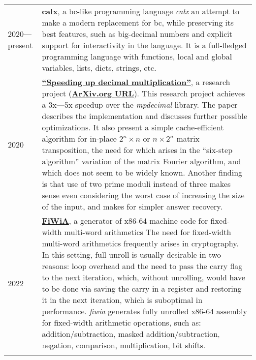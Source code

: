 \documentclass[10pt]{article}
\begin{document}
\begin{tabularx}{\textwidth}{ l X }
    2020---present & \href{https://github.com/shdown/calx}{\textbf{calx}}, a bc-like programming language
    \newline
    \footnotesize{
        \textit{calx} an attempt to make a modern replacement for bc, while preserving its best features, such as big-decimal numbers and explicit support for interactivity in the language.
        It is a full-fledged programming language with functions, local and global variables, lists, dicts, strings, etc.
    }
    \\
    \medskip

    2020 & \href{https://github.com/shdown/decimal-multiplication-paper}{\textbf{``Speeding up decimal multiplication''}}, a research project (\href{https://arxiv.org/abs/2011.11524}{\textbf{ArXiv.org URL}}).
    \newline
    \footnotesize{
        This research project achieves a 3x---5x speedup over the \textit{mpdecimal} library.
        The paper describes the implementation and discusses further possible optimizations. It also present a simple cache-efficient algorithm for in-place
        $2^n \times n$ or $n \times 2^n$ matrix transposition, the need for which arises in the
        ``six-step algorithm'' variation of the matrix Fourier algorithm, and
        which does not seem to be widely known. Another finding is that use
        of two prime moduli instead of three makes sense even considering the
        worst case of increasing the size of the input, and makes for simpler
        answer recovery.
    }
    \\
    \medskip

    2022 & \href{https://github.com/shdown/fiwia}{\textbf{FiWiA}}, a generator of x86-64 machine code for fixed-width multi-word arithmetics
    \newline
    \footnotesize{
        The need for fixed-width multi-word arithmetics frequently arises in cryptography.
        In this setting, full unroll is usually desirable in two reasons: loop overhead and the need to pass the carry flag to the next iteration,
        which, without unrolling, would have to be done via saving the carry in a register and restoring it in the next iteration,
        which is suboptimal in performance.
        \textit{fiwia} generates fully unrolled x86-64 assembly for fixed-width arithmetic operations, such as:
        addition/subtraction,
        masked addition/subtraction,
        negation,
        comparison,
        multiplication,
        bit shifts.
    }
    \\
    \medskip


\end{tabularx}
\end{document}
